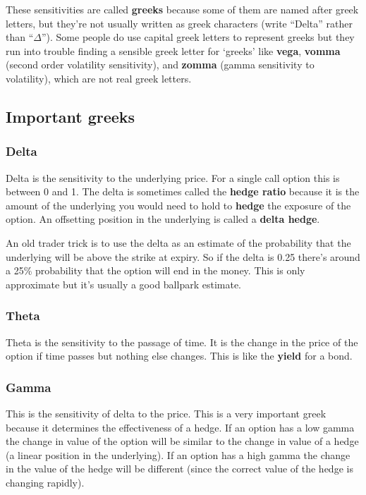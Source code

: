 These sensitivities are called \textbf{greeks} because some of them are named after greek letters, but they're not usually written as greek characters (write ``Delta'' rather than ``$\Delta$''). Some people do use capital greek letters to represent greeks but they run into trouble finding a sensible greek letter for `greeks' like \textbf{vega}, \textbf{vomma} (second order volatility sensitivity), and \textbf{zomma} (gamma sensitivity to volatility), which are not real greek letters. 
\subsection{Important greeks}

\subsubsection{Delta}

Delta is the sensitivity to the underlying price. For a single call option this is between 0 and 1. The delta is sometimes called the \textbf{hedge ratio} because it is the amount of the underlying you would need to hold to \textbf{hedge} the exposure of the option. An offsetting position in the underlying is called a \textbf{delta hedge}.
 
An old trader trick is to use the delta as an estimate of the probability that the underlying will be above the strike at expiry. So if the delta is 0.25 there's around a 25\% probability that the option will end in the money.  This is only approximate but it's usually a good ballpark estimate.

\subsubsection{Theta}

Theta is the sensitivity to the passage of time. It is the change in the price of the option if time passes but nothing else changes. This is like the \textbf{yield} for a bond.

\subsubsection{Gamma}

This is the sensitivity of delta to the price. This is a very important greek because it determines the effectiveness of a hedge. If an option has a low gamma the change in value of the option will be similar to the change in value of a hedge (a linear position in the underlying). If an option has a high gamma the change in the value of the hedge will be different (since the correct value of the hedge is changing rapidly). 

